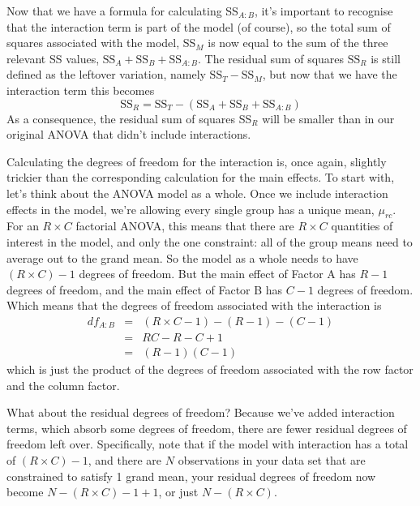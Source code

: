 Now that we have a formula for calculating SS$_{A:B}$, it's important to recognise that the interaction term is part of the model (of course), so the total sum of squares associated with the model, SS$_M$ is now equal to the sum of the three relevant SS values, $\mbox{SS}_A + \mbox{SS}_B + \mbox{SS}_{A:B}$. The residual sum of squares $\mbox{SS}_R$ is still defined as the leftover variation, namely $\mbox{SS}_T - \mbox{SS}_M$, but now that we have the interaction term this becomes
$$
\mbox{SS}_R = \mbox{SS}_T - (\mbox{SS}_A + \mbox{SS}_B + \mbox{SS}_{A:B})
$$ 
As a consequence, the residual sum of squares SS$_R$ will be smaller than in our original ANOVA that didn't include interactions.


Calculating the degrees of freedom for the interaction is, once again, slightly trickier than the corresponding calculation for the main effects. To start with, let's think about the ANOVA model as a whole. Once we include interaction effects in the model, we're allowing every single group has a unique mean, $\mu_{rc}$. For an $R \times C$ factorial ANOVA, this means that there are $R \times C$ quantities of interest in the model, and only the one constraint: all of the group means need to average out to the grand mean. So the model as a whole needs to have $(R\times C) - 1$ degrees of freedom. But the main effect of Factor A has $R-1$ degrees of freedom, and the main effect of Factor B has $C-1$ degrees of freedom. Which means that the degrees of freedom associated with the interaction is 
\begin{eqnarray*}
df_{A:B} &=& (R\times C - 1) - (R - 1) - (C -1 ) \\
&=& RC - R - C + 1 \\
&=& (R-1)(C-1)
\end{eqnarray*}
which is just the product of the degrees of freedom associated with the row factor and the column factor.

What about the residual degrees of freedom? Because we've added interaction terms, which absorb some degrees of freedom, there are fewer residual degrees of freedom left over. Specifically, note that if the model with interaction has a total of $(R\times C) - 1$, and there are $N$ observations in your data set that are constrained to satisfy 1 grand mean, your residual degrees of freedom now become $N-(R \times C)-1+1$, or just $N-(R \times C)$.

